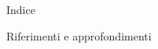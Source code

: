 \documentclass[
    11pt,
    aspectratio=169
]{beamer}
\title[\LectureDetails]{\LectureTopic}
\subtitle{\LectureDetails}
\author[Prof. L. E. Dei Rossi]{Prof. Leonardo Essam Dei Rossi}
\date{Anno scolastico \CourseSchoolYear}
\begin{document}
\begin{frame}[plain]
  \titlepage
\end{frame}



\begin{frame}{Indice}
  \tableofcontents
\end{frame}





\begin{frame}{Riferimenti e approfondimenti}
  \printbibliography
\end{frame}
\end{document}
